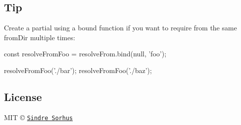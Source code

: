 \subsection*{Tip}

Create a partial using a bound function if you want to require from the same {\ttfamily from\+Dir} multiple times\+:


\begin{DoxyCode}
const resolveFromFoo = resolveFrom.bind(null, 'foo');

resolveFromFoo('./bar');
resolveFromFoo('./baz');
\end{DoxyCode}


\subsection*{License}

M\+IT © \href{http://sindresorhus.com}{\tt Sindre Sorhus} 